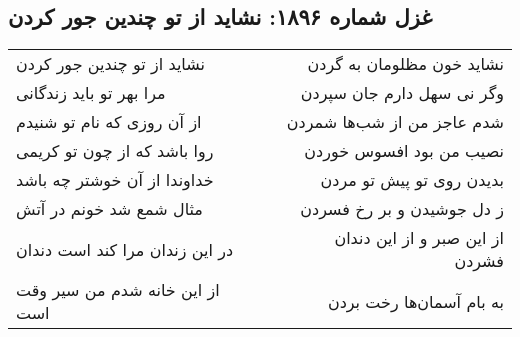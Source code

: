 \begin{center}
\section*{غزل شماره ۱۸۹۶: نشاید از تو چندین جور کردن}
\label{sec:1896}
\begin{longtable}{l p{0.5cm} r}
نشاید از تو چندین جور کردن
&&
نشاید خون مظلومان به گردن
\\
مرا بهر تو باید زندگانی
&&
وگر نی سهل دارم جان سپردن
\\
از آن روزی که نام تو شنیدم
&&
شدم عاجز من از شب‌ها شمردن
\\
روا باشد که از چون تو کریمی
&&
نصیب من بود افسوس خوردن
\\
خداوندا از آن خوشتر چه باشد
&&
بدیدن روی تو پیش تو مردن
\\
مثال شمع شد خونم در آتش
&&
ز دل جوشیدن و بر رخ فسردن
\\
در این زندان مرا کند است دندان
&&
از این صبر و از این دندان فشردن
\\
از این خانه شدم من سیر وقت است
&&
به بام آسمان‌ها رخت بردن
\\
\end{longtable}
\end{center}
